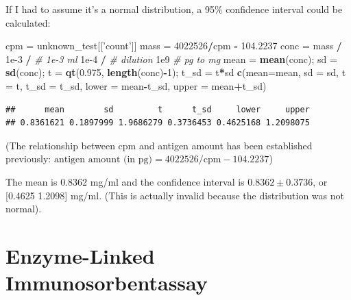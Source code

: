 \documentclass[
]{article}
\newenvironment{Shaded}{\begin{snugshade}}{\end{snugshade}}
\newcommand{\CommentTok}[1]{\textcolor[rgb]{0.56,0.35,0.01}{\textit{#1}}}
\newcommand{\DataTypeTok}[1]{\textcolor[rgb]{0.13,0.29,0.53}{#1}}
\newcommand{\DecValTok}[1]{\textcolor[rgb]{0.00,0.00,0.81}{#1}}
\newcommand{\FloatTok}[1]{\textcolor[rgb]{0.00,0.00,0.81}{#1}}
\newcommand{\KeywordTok}[1]{\textcolor[rgb]{0.13,0.29,0.53}{\textbf{#1}}}
\newcommand{\NormalTok}[1]{#1}
\newcommand{\OperatorTok}[1]{\textcolor[rgb]{0.81,0.36,0.00}{\textbf{#1}}}
\newcommand{\StringTok}[1]{\textcolor[rgb]{0.31,0.60,0.02}{#1}}
\begin{document}
If I had to assume it's a normal distribution, a 95\% confidence interval could be calculated:

\begin{Shaded}
\begin{Highlighting}[]
\NormalTok{cpm =}\StringTok{ }\NormalTok{unknown_test[[}\StringTok{'count'}\NormalTok{]]}
\NormalTok{mass =}\StringTok{ }\DecValTok{4022526}\OperatorTok{/}\NormalTok{cpm }\OperatorTok{-}\StringTok{ }\FloatTok{104.2237}
\NormalTok{conc =}\StringTok{ }\NormalTok{mass }\OperatorTok{/}
\StringTok{          }\FloatTok{1e-3} \OperatorTok{/}\StringTok{ }\CommentTok{# 1e-3 ml}
\StringTok{          }\FloatTok{1e-4} \OperatorTok{/}\StringTok{ }\CommentTok{# dilution}
\StringTok{          }\FloatTok{1e9}  \CommentTok{# pg to mg}
\NormalTok{mean =}\StringTok{ }\KeywordTok{mean}\NormalTok{(conc); sd =}\StringTok{ }\KeywordTok{sd}\NormalTok{(conc);}
\NormalTok{t =}\StringTok{ }\KeywordTok{qt}\NormalTok{(}\FloatTok{0.975}\NormalTok{, }\KeywordTok{length}\NormalTok{(conc)}\OperatorTok{-}\DecValTok{1}\NormalTok{); t_sd =}\StringTok{ }\NormalTok{t}\OperatorTok{*}\NormalTok{sd}
\KeywordTok{c}\NormalTok{(}\DataTypeTok{mean=}\NormalTok{mean, }\DataTypeTok{sd =}\NormalTok{ sd, }\DataTypeTok{t =}\NormalTok{ t, }\DataTypeTok{t_sd =}\NormalTok{ t_sd, }\DataTypeTok{lower =}\NormalTok{ mean}\OperatorTok{-}\NormalTok{t_sd, }\DataTypeTok{upper =}\NormalTok{ mean}\OperatorTok{+}\NormalTok{t_sd)}
\end{Highlighting}
\end{Shaded}

\begin{verbatim}
##      mean        sd         t      t_sd     lower     upper 
## 0.8361621 0.1897999 1.9686279 0.3736453 0.4625168 1.2098075
\end{verbatim}

(The relationship between cpm and antigen amount has been established previously: \(\text{antigen amount (in pg)}=4022526/\text{cpm} - 104.2237\))

The mean is 0.8362 mg/ml and the confidence interval is \(0.8362\pm0.3736\), or {[}0.4625 1.2098{]} mg/ml. (This is actually invalid because the distribution was not normal).

\hypertarget{enzyme-linked-immunosorbentassay}{%
\section{Enzyme-Linked Immunosorbentassay}\label{enzyme-linked-immunosorbentassay}}
\end{document}
